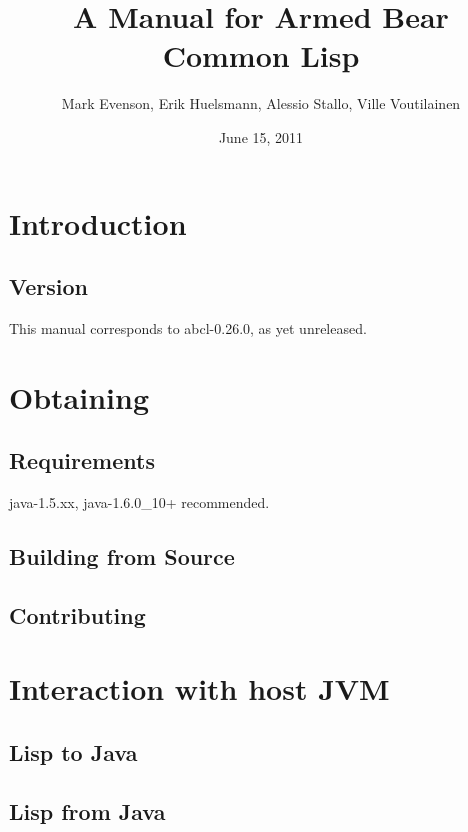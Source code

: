 \documentclass[10pt]{article}
\begin{document}
\title{A Manual for Armed Bear Common Lisp}
\date{June 15, 2011}
\author{Mark Evenson, Erik Huelsmann, Alessio Stallo, Ville Voutilainen}

\section{Introduction}
\subsection{Version}

This manual corresponds to abcl-0.26.0, as yet unreleased.

\section{Obtaining}

\subsection{Requirements}

java-1.5.xx, java-1.6.0_10+ recommended.

\subsection{Building from Source}

\subsection{Contributing}

\section{Interaction with host JVM}


\subsection{Lisp to Java}

\subsection{Lisp from Java}
\end{document}
